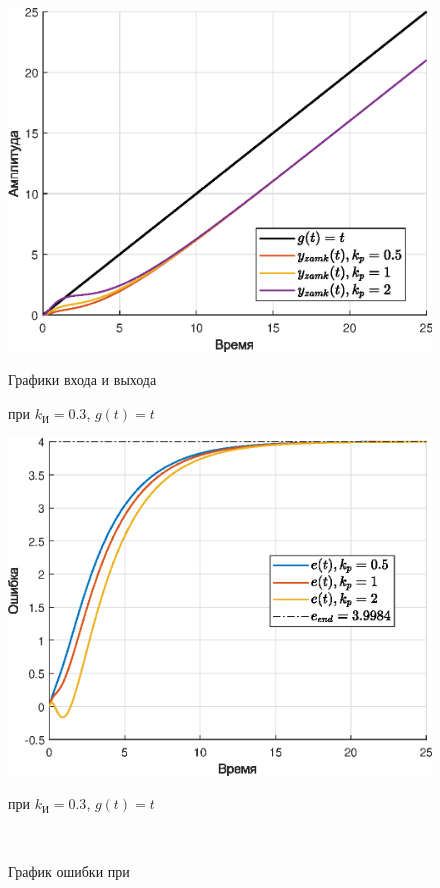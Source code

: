 \documentclass[a4paper]{article}
\begin{document}
\begin{figure}[H]
    \begin{minipage}{0.5\textwidth}
        \centering \includegraphics[width=\textwidth]{ex5/ki_0.3_g_vt.eps}
        \caption{Графики входа и выхода}
        \centerline{при $k_{\text{И}} = 0.3$, $g(t)=t$}
    \end{minipage}\hfill
    \begin{minipage}{0.5\textwidth}
        \centering \includegraphics[width=\textwidth]{ex5/ki_0.3_g_vt_error.eps}
        \caption{График ошибки при}
        \centerline{при $k_{\text{И}} = 0.3$, $g(t)=t$}
    \end{minipage}\\[1em]
\end{figure}\noindent\
\end{document}
